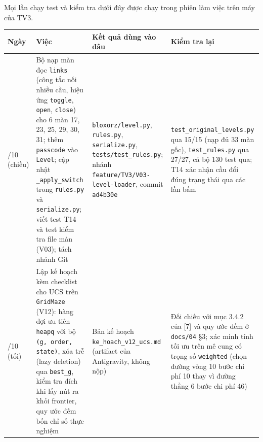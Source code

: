 Mọi lần chạy test và kiểm tra dưới đây được chạy trong phiên làm việc trên máy của TV3.


{\def\LTcaptype{none} %
\begin{longtable}[]{@{}
  >{\raggedright\arraybackslash}p{}
  >{\raggedright\arraybackslash}p{}
  >{\raggedright\arraybackslash}p{}
  >{\raggedright\arraybackslash}p{}@{}}
\toprule\noalign{}
\rowcolor{tablehead}\begin{minipage}[b]{\linewidth}\raggedright
\textbf{Ngày}
\end{minipage} & \begin{minipage}[b]{\linewidth}\raggedright
\textbf{Việc}
\end{minipage} & \begin{minipage}[b]{\linewidth}\raggedright
\textbf{Kết quả dùng vào đâu}
\end{minipage} & \begin{minipage}[b]{\linewidth}\raggedright
\textbf{Kiểm tra lại}
\end{minipage} \\
\midrule\noalign{}
\endhead
\bottomrule\noalign{}
\endlastfoot
21/10 (chiều) & Bộ nạp màn đọc \texttt{links} (công tắc nối nhiều cầu, hiệu ứng \texttt{toggle}, \texttt{open}, \texttt{close}) cho 6 màn 17, 23, 25, 29, 30, 31; thêm \texttt{passcode} vào \texttt{Level}; cập nhật \texttt{\_\allowbreak{}apply\_\allowbreak{}switch} trong \texttt{rules.\allowbreak{}py} và \texttt{serialize.\allowbreak{}py}; viết test T14 và test kiểm tra file màn (V03); tách nhánh Git & \texttt{bloxorz/\allowbreak{}level.\allowbreak{}py}, \texttt{rules.\allowbreak{}py}, \texttt{serialize.\allowbreak{}py}, \texttt{tests/\allowbreak{}test\_\allowbreak{}rules.\allowbreak{}py}; nhánh \texttt{feature/\allowbreak{}TV3/\allowbreak{}V03-\allowbreak{}level-\allowbreak{}loader}, commit \texttt{ad4b30e} & \texttt{test\_\allowbreak{}original\_\allowbreak{}levels.\allowbreak{}py} qua 15/15 (nạp đủ 33 màn gốc), \texttt{test\_\allowbreak{}rules.\allowbreak{}py} qua 27/27, cả bộ 130 test qua; T14 xác nhận cầu đổi đúng trạng thái qua các lần bấm \\
\rowrule
21/10 (tối) & Lập kế hoạch kèm checklist cho UCS trên \texttt{GridMaze} (V12): hàng đợi ưu tiên \texttt{heapq} với bộ \texttt{(g, order, state)}, xóa trễ (lazy deletion) qua \texttt{best\_\allowbreak{}g}, kiểm tra đích khi lấy nút ra khỏi frontier, quy ước đếm bốn chỉ số thực nghiệm & Bản kế hoạch \texttt{ke\_\allowbreak{}hoach\_\allowbreak{}v12\_\allowbreak{}ucs.\allowbreak{}md} (artifact của Antigravity, không nộp) & Đối chiếu với mục 3.4.2 của {[}7{]} và quy ước đếm ở \texttt{docs/\allowbreak{}04} §3; xác minh tính tối ưu trên mê cung có trọng số \texttt{weighted} (chọn đường vòng 10 bước chi phí 10 thay vì đường thẳng 6 bước chi phí 46) \\

\end{longtable}}
